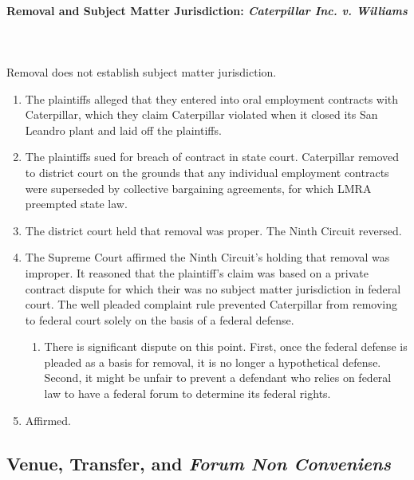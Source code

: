 \paragraph{Removal and Subject Matter Jurisdiction: \emph{Caterpillar Inc. v. 
Williams}}
~\\\\
Removal does not establish subject matter jurisdiction.

\begin{enumerate}
    \item The plaintiffs alleged that they entered into oral employment 
    contracts with Caterpillar, which they claim Caterpillar violated when it 
    closed its San Leandro plant and laid off the plaintiffs.
    \item The plaintiffs sued for breach of contract in state court. 
    Caterpillar removed to district court on the grounds that any individual 
    employment contracts were superseded by collective bargaining agreements, 
    for which LMRA preempted state law.
    \item The district court held that removal was proper. The Ninth Circuit 
    reversed.
    \item The Supreme Court affirmed the Ninth Circuit's holding that removal 
    was improper. It reasoned that the plaintiff's claim was based on a 
    private contract dispute for which their was no subject matter 
    jurisdiction in federal court. The well pleaded complaint rule prevented 
    Caterpillar from removing to federal court solely on the basis of a 
    federal defense.
    \begin{enumerate}
        \item There is significant dispute on this point. First, once the 
        federal defense is pleaded as a basis for removal, it is no longer a 
        hypothetical defense. Second, it might be unfair to prevent a 
        defendant who relies on federal law to have a federal forum to 
        determine its federal rights.
    \end{enumerate}
    \item Affirmed.
\end{enumerate}

\subsection{Venue, Transfer, and \emph{Forum Non Conveniens}}

